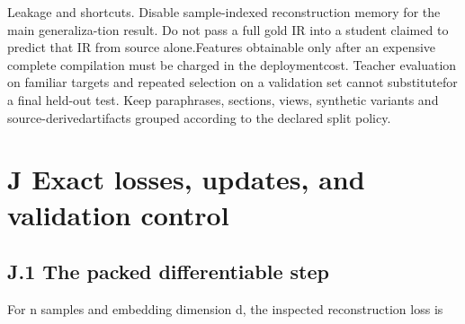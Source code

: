 
\noindent
Leakage and shortcuts. Disable sample-indexed reconstruction memory for the main generaliza-\linebreak[4]
tion result. Do not pass a full gold IR into a student claimed to predict that IR from source alone.\linebreak[4]
Features obtainable only after an expensive complete compilation must be charged in the deployment\linebreak[4]
cost. Teacher evaluation on familiar targets and repeated selection on a validation set cannot substitute\linebreak[4]
for a final held-out test. Keep paraphrases, sections, views, synthetic variants and source-derived\linebreak[4]
artifacts grouped according to the declared split policy.\par

\section*{J  Exact losses, updates, and validation control}
\subsection*{J.1  The packed differentiable step}
\noindent
For n samples and embedding dimension d, the inspected reconstruction loss is\par


